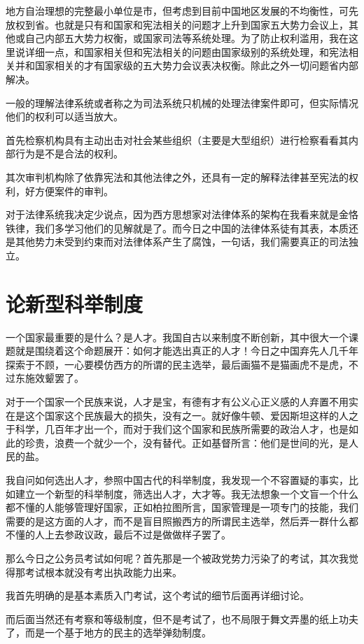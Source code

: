 \documentclass[11pt,oneside]{article}
\begin{document}
地方自治理想的完整最小单位是市，但考虑到目前中国地区发展的不均衡性，可先放权到省。也就是只有和国家和宪法相关的问题才上升到国家五大势力会议上，其他或自己内部五大势力权衡，或国家司法等系统处理。为了防止权利滥用，我在这里说详细一点，和国家相关但和宪法相关的问题由国家级别的系统处理，和宪法相关并和国家相关的才有国家级的五大势力会议表决权衡。除此之外一切问题省内部解决。

一般的理解法律系统或者称之为司法系统只机械的处理法律案件即可，但实际情况他们的权利可以适当放大。

首先检察机构具有主动出击对社会某些组织（主要是大型组织）进行检察看看其内部行为是不是合法的权利。

其次审判机构除了依靠宪法和其他法律之外，还具有一定的解释法律甚至宪法的权利，好方便案件的审判。

对于法律系统我决定少说点，因为西方思想家对法律体系的架构在我看来就是金恪铁律，我们多学习他们的见解就是了。而今日之中国的法律体系徒有其表，本质还是其他势力未受到约束而对法律体系产生了腐蚀，一句话，我们需要真正的司法独立。



\section{论新型科举制度}
\label{sec-3}
一个国家最重要的是什么？是人才。我国自古以来制度不断创新，其中很大一个课题就是围绕着这个命题展开：如何才能选出真正的人才！今日之中国弃先人几千年探索于不顾，一心要模仿西方的所谓的民主选举，最后画猫不是猫画虎不是虎，不过东施效颦罢了。

对于一个国家一个民族来说，人才是宝，有德有才有公义心正义感的人弃置不用实在是这个国家这个民族最大的损失，没有之一。就好像牛顿、爱因斯坦这样的人之于科学，几百年才出一个，而对于我们这个国家和民族所需要的政治人才，也是如此的珍贵，浪费一个就少一个，没有替代。正如基督所言：他们是世间的光，是人民的盐。

我自问如何选出人才，参照中国古代的科举制度，我发现一个不容置疑的事实，比如建立一个新型的科举制度，筛选出人才，大才等。我无法想象一个文盲一个什么都不懂的人能够管理好国家，正如柏拉图所言，国家管理是一项专门的技能，我们需要的是这方面的人才，而不是盲目照搬西方的所谓民主选举，然后弄一群什么都不懂的人上去参政议政，最后不过是做做样子罢了。

那么今日之公务员考试如何呢？首先那是一个被政党势力污染了的考试，其次我觉得那考试根本就没有考出执政能力出来。

我首先明确的是基本素质入门考试，这个考试的细节后面再详细讨论。

而后面当然还有考察和等级制度，但不是考试了，也不局限于舞文弄墨的纸上功夫了，而是一个基于地方的民主的选举弹劾制度。
\end{document}
